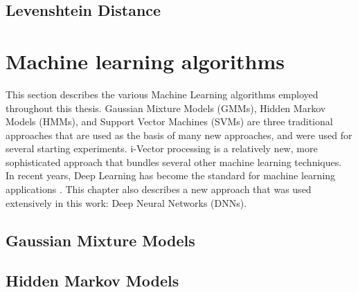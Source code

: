 \subsection{Levenshtein Distance}

\section{Machine learning algorithms}
This section describes the various Machine Learning algorithms employed throughout this thesis. Gaussian Mixture Models (GMMs), Hidden Markov Models (HMMs), and Support Vector Machines (SVMs) are three traditional approaches that are used as the basis of many new approaches, and were used for several starting experiments. i-Vector processing is a relatively new, more sophisticated approach that bundles several other machine learning techniques.\\
In recent years, Deep Learning has become the standard for machine learning applications \cite{}. This chapter also describes a new approach that was used extensively in this work: Deep Neural Networks (DNNs).



\subsection{Gaussian Mixture Models}
\subsection{Hidden Markov Models}

